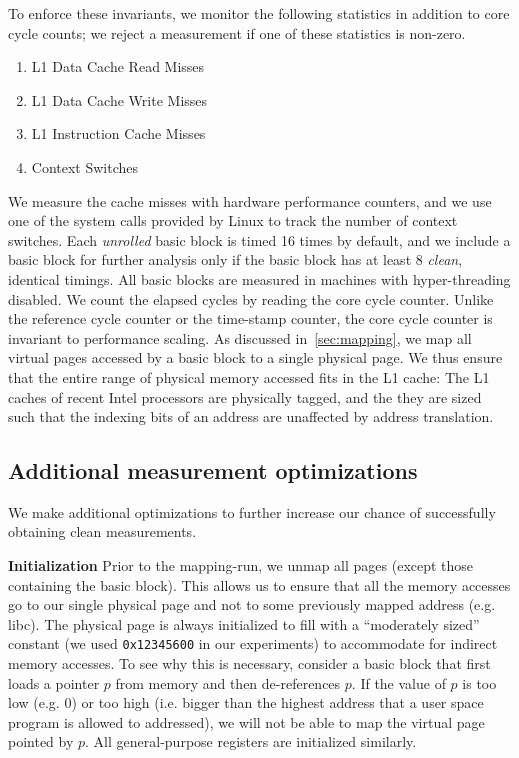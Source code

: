 To enforce these invariants, we monitor the following statistics in addition to core cycle counts;
we reject a measurement if one of these statistics is non-zero. 
\begin{enumerate}
    \item L1 Data Cache Read Misses
    \item L1 Data Cache Write Misses
    \item L1 Instruction Cache Misses
    \item Context Switches
\end{enumerate}
We measure the cache misses with hardware performance counters, 
and we use one of the system calls provided by Linux to track the number of context switches. 
Each \textit{unrolled} basic block is timed 16 times by default,
and we include a basic block for further analysis only if the basic block has at least 
8 \textit{clean}, identical timings.
All basic blocks are measured in machines with hyper-threading disabled.
We count the elapsed cycles by reading the core cycle counter.
Unlike the reference cycle counter or the time-stamp counter, the core cycle counter is invariant
to performance scaling.
As discussed in~\ref{sec:mapping}, we map all virtual pages accessed by 
a basic block to a single physical page.
We thus ensure that the entire range of physical memory accessed fits in the L1 cache: The L1 caches of recent Intel processors are physically tagged, and
the they are sized such that the indexing bits of an address are unaffected by address translation.

\subsection{Additional measurement optimizations}
We make additional optimizations to further increase our chance
of successfully obtaining clean measurements.

\textbf{Initialization} 
Prior to the mapping-run,
we unmap all pages (except those containing the basic block).
This allows us to ensure that all the memory accesses go to our single 
physical page and not to some previously mapped address (e.g. libc).
The physical page is
always initialized to fill with a “moderately sized” constant
(we used \verb|0x12345600| in our experiments)
to accommodate for indirect memory accesses.
To see why this is necessary,
consider a basic block that first loads a pointer $p$ from memory
and then de-references $p$.
If the value of $p$ is too low (e.g. 0)
or too high
(i.e. bigger than the highest address that
a user space program is allowed to addressed),
we will not be able to map the virtual page pointed by $p$.
All general-purpose registers are initialized similarly.

